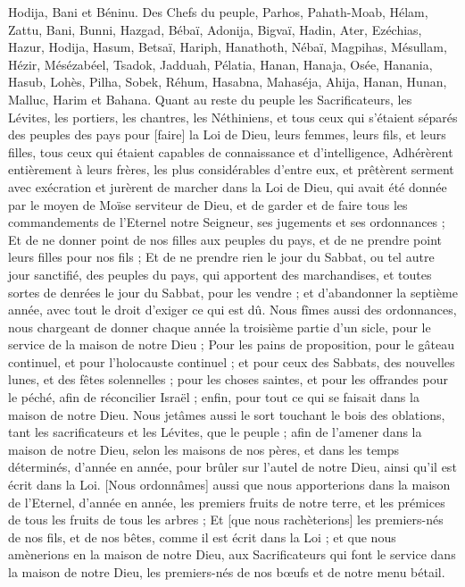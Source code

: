 \begin{multicols}{2}
{Hodija, Bani et Béninu.
Des Chefs du peuple, Parhos, Pahath-Moab, Hélam, Zattu, Bani,
Bunni, Hazgad, Bébaï,
Adonija, Bigvaï, Hadin,
Ater, Ezéchias, Hazur,
Hodija, Hasum, Betsaï,
Hariph, Hanathoth, Nébaï,
Magpihas, Mésullam, Hézir,
Mésézabéel, Tsadok, Jadduah,
Pélatia, Hanan, Hanaja,
Osée, Hanania, Hasub,
Lohès, Pilha, Sobek,
Réhum, Hasabna, Mahaséja,
Ahija, Hanan, Hunan,
Malluc, Harim et Bahana.
Quant au reste du peuple les Sacrificateurs, les Lévites, les portiers, les chantres, les Néthiniens, et tous ceux qui s'étaient séparés des peuples des pays pour [faire] la Loi de Dieu, leurs femmes, leurs fils, et leurs filles, tous ceux qui étaient capables de connaissance et d'intelligence,
Adhérèrent entièrement à leurs frères, les plus considérables d'entre eux, et prêtèrent serment avec exécration et jurèrent de marcher dans la Loi de Dieu, qui avait été donnée par le moyen de Moïse serviteur de Dieu, et de garder et de faire tous les commandements de l'Eternel notre Seigneur, ses jugements et ses ordonnances ;
Et de ne donner point de nos filles aux peuples du pays, et de ne prendre point leurs filles pour nos fils ;
Et de ne prendre rien le jour du Sabbat, ou tel autre jour sanctifié, des peuples du pays, qui apportent des marchandises, et toutes sortes de denrées le jour du Sabbat, pour les vendre ; et d'abandonner la septième année, avec tout le droit d'exiger ce qui est dû.
Nous fîmes aussi des ordonnances, nous chargeant de donner chaque année la troisième partie d'un sicle, pour le service de la maison de notre Dieu ;
Pour les pains de proposition, pour le gâteau continuel, et pour l'holocauste continuel ; et pour ceux des Sabbats, des nouvelles lunes, et des fêtes solennelles ; pour les choses saintes, et pour les offrandes pour le péché, afin de réconcilier Israël ; enfin, pour tout ce qui se faisait dans la maison de notre Dieu.
Nous jetâmes aussi le sort touchant le bois des oblations, tant les sacrificateurs et les Lévites, que le peuple ; afin de l'amener dans la maison de notre Dieu, selon les maisons de nos pères, et dans les temps déterminés, d'année en année, pour brûler sur l'autel de notre Dieu, ainsi qu'il est écrit dans la Loi.
[Nous ordonnâmes] aussi que nous apporterions dans la maison de l'Eternel, d'année en année, les premiers fruits de notre terre, et les prémices de tous les fruits de tous les arbres ;
Et [que nous rachèterions] les premiers-nés de nos fils, et de nos bêtes, comme il est écrit dans la Loi ; et que nous amènerions en la maison de notre Dieu, aux Sacrificateurs qui font le service dans la maison de notre Dieu, les premiers-nés de nos bœufs et de notre menu bétail.
}
\end{multicols}
